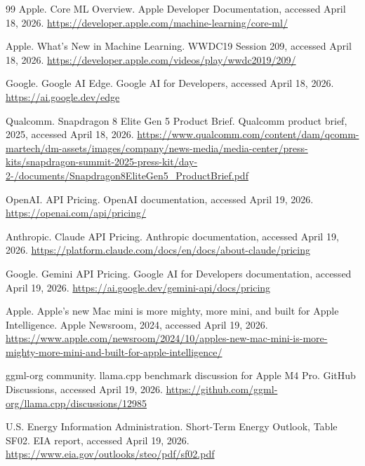 \documentclass[11pt,a4paper]{article}
\begin{document}
\begin{thebibliography}{99}
Apple.
\newblock Core ML Overview.
\newblock Apple Developer Documentation, accessed April 18, 2026.
\newblock \url{https://developer.apple.com/machine-learning/core-ml/}

Apple.
\newblock What's New in Machine Learning.
\newblock WWDC19 Session 209, accessed April 18, 2026.
\newblock \url{https://developer.apple.com/videos/play/wwdc2019/209/}

Google.
\newblock Google AI Edge.
\newblock Google AI for Developers, accessed April 18, 2026.
\newblock \url{https://ai.google.dev/edge}

Qualcomm.
\newblock Snapdragon 8 Elite Gen 5 Product Brief.
\newblock Qualcomm product brief, 2025, accessed April 18, 2026.
\newblock \url{https://www.qualcomm.com/content/dam/qcomm-martech/dm-assets/images/company/news-media/media-center/press-kits/snapdragon-summit-2025-press-kit/day-2-/documents/Snapdragon8EliteGen5_ProductBrief.pdf}

OpenAI.
\newblock API Pricing.
\newblock OpenAI documentation, accessed April 19, 2026.
\newblock \url{https://openai.com/api/pricing/}

Anthropic.
\newblock Claude API Pricing.
\newblock Anthropic documentation, accessed April 19, 2026.
\newblock \url{https://platform.claude.com/docs/en/docs/about-claude/pricing}

Google.
\newblock Gemini API Pricing.
\newblock Google AI for Developers documentation, accessed April 19, 2026.
\newblock \url{https://ai.google.dev/gemini-api/docs/pricing}

Apple.
\newblock Apple's new Mac mini is more mighty, more mini, and built for Apple Intelligence.
\newblock Apple Newsroom, 2024, accessed April 19, 2026.
\newblock \url{https://www.apple.com/newsroom/2024/10/apples-new-mac-mini-is-more-mighty-more-mini-and-built-for-apple-intelligence/}

ggml-org community.
\newblock llama.cpp benchmark discussion for Apple M4 Pro.
\newblock GitHub Discussions, accessed April 19, 2026.
\newblock \url{https://github.com/ggml-org/llama.cpp/discussions/12985}

U.S. Energy Information Administration.
\newblock Short-Term Energy Outlook, Table SF02.
\newblock EIA report, accessed April 19, 2026.
\newblock \url{https://www.eia.gov/outlooks/steo/pdf/sf02.pdf}


\end{thebibliography}
\end{document}

